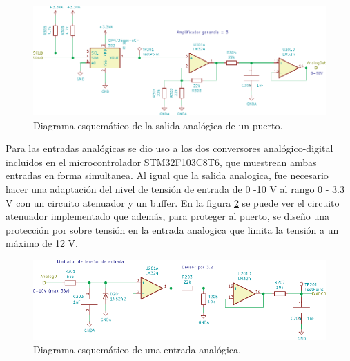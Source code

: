 \begin{figure}[H]
	\centering
	\includegraphics[width=1\textwidth]{./Figures/SalidaAnalogica.pdf}
	\caption{Diagrama esquemático de la salida analógica de un puerto.}
	\label{fig:SalidaAnalogica}
\end{figure}

Para las entradas analógicas se dio uso a los dos conversores analógico-digital incluidos en el microcontrolador STM32F103C8T6, que muestrean ambas entradas en forma simultanea. Al igual que la salida analogica, fue necesario hacer una adaptación del nivel de tensión de entrada de 0 -10 V al rango 0 - 3.3 V con un circuito atenuador y un buffer. En la figura \ref{fig:EntradaAnalogica} se puede ver el circuito atenuador implementado que además, para proteger al puerto, se diseño una protección por sobre tensión en la entrada analogica que limita la tensión a un máximo de 12 V.

\begin{figure}[H]
	\centering
	\includegraphics[width=1\textwidth]{./Figures/EntradaAnalogica.pdf}
	\caption{Diagrama esquemático de una entrada analógica.}
	\label{fig:EntradaAnalogica}
\end{figure}


